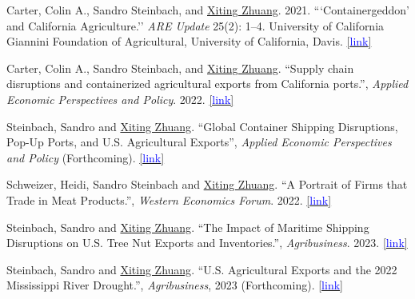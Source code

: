 \documentclass[11 pt,letterpaper]{article}
\renewenvironment{itemize}{
	\begin{list}{}{
			\setlength{\leftmargin}{1.5em}
		}
	}{
	\end{list}
}
\begin{document}
		\begin{itemize}
 
 
 \item[-] Carter, Colin A., Sandro Steinbach, and \underline{Xiting Zhuang}. 2021. ```Containergeddon’ and California Agriculture.'' \textit{ARE Update} 25(2): 1–4. University of California Giannini Foundation of Agricultural, University of California, Davis.  \href{https://s.giannini.ucop.edu/uploads/pub/2021/12/20/v25n2_1.pdf}{[{\underline{\textcolor{blue}{link}}}]}
 
 \item[-]  Carter, Colin A., Sandro Steinbach, and \underline{Xiting Zhuang}. ``Supply chain disruptions and containerized agricultural exports from California ports.'', \textit{Applied Economic Perspectives and Policy}. 2022. 
 \href{https://doi.org/10.1002/aepp.13311}{[{\underline{\textcolor{blue}{link}}}]}
 
 	 \item[-]   Steinbach, Sandro and \underline{Xiting Zhuang}. ``Global Container Shipping Disruptions, Pop-Up Ports, and U.S. Agricultural Exports'', \textit{Applied Economic Perspectives and Policy} (Forthcoming). 
 \href{https://www.google.com/url?sa=t&rct=j&q=&esrc=s&source=web&cd=&ved=2ahUKEwje69eghNX8AhXokYkEHWQsBCAQFnoECBgQAQ&url=https%3A%2F%2Fwww.aeaweb.org%2Fconference%2F2023%2Fprogram%2Fpaper%2F9b9y39sR&usg=AOvVaw3gBn65ltqGdSrvv1mvi78O}{[{\underline{\textcolor{blue}{link}}}]}
 
 
 
		 \item[-] 	Schweizer, Heidi, Sandro Steinbach and  \underline{Xiting Zhuang}. ``A Portrait of Firms that Trade in Meat Products.'', \textit{Western Economics Forum}. 2022.  \href{https://waeaonline.org/wp-content/uploads/2022/12/WEF-Fall-2022-Issue-20-Volume-2-All-Intro-and-Articles.pdf#page=6}{[{\underline{\textcolor{blue}{link}}}]}
 
 
     	\item[-] Steinbach, Sandro and  \underline{Xiting Zhuang}. ``The Impact of Maritime Shipping Disruptions on U.S. Tree Nut Exports and Inventories.'', \textit{Agribusiness}. 2023.  
 	\href{https://doi.org/10.1002/agr.21809}{[{\underline{\textcolor{blue}{link}}}]}
	
	
		
	\item[-] Steinbach, Sandro and  \underline{Xiting Zhuang}. ``U.S. Agricultural Exports and the 2022 Mississippi River Drought.'', \textit{Agribusiness}, 2023 (Forthcoming).    	\href{https://ageconsearch.umn.edu/record/335476/files/26473.pdf}{[{\underline{\textcolor{blue}{link}}}]}
	

\end{itemize}
\end{document}
